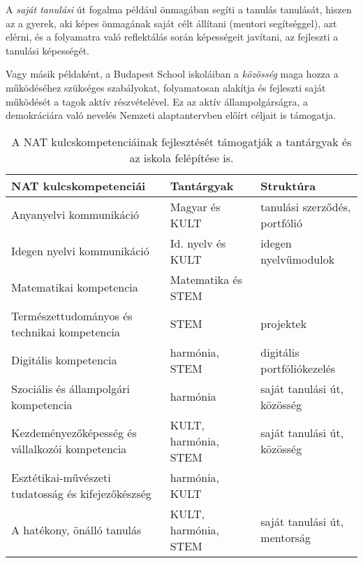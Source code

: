 A \emph{saját tanulási} út fogalma például önmagában segíti a tanulás
tanulását, hiszen az a gyerek, aki képes önmagának saját célt állítani (mentori
segítséggel), azt elérni, és a folyamatra való reflektálás során képességeit
javítani, az fejleszti a tanulási képességét.

Vagy másik példaként, a Budapest School iskoláiban a \emph{közösség} maga hozza
a működéséhez szükséges szabályokat, folyamatosan alakítja és fejleszti saját
működését a tagok aktív részvételével. Ez az aktív állampolgárságra, a
demokráciára való nevelés Nemzeti alaptantervben előírt céljait is támogatja.

\begin{table}
  \centering
  \begin{tabular}{p{5cm}|>{\raggedright}p{3cm}|p{3cm}}

    \textbf{NAT kulcskompetenciái}                     & \textbf{Tantárgyak}  &
    \textbf{Struktúra}                                                                                        \\ \hline
    Anyanyelvi kommunikáció                            &  Magyar és KULT                & tanulási szerződés, portfólió \\ \hline
    Idegen nyelvi kommunikáció                         & Id. nyelv és KULT                 & idegen nyelvű\hfill\break modulok          \\ \hline
    Matematikai kompetencia                            & Matematika és STEM                 &                               \\ \hline
    Természettudományos és technikai kompetencia       & STEM                 & projektek                     \\ \hline
    Digitális kompetencia                              & harmónia, STEM       & digitális portfóliókezelés   \\ \hline
    Szociális és állampolgári kompetencia              & harmónia             & saját tanulási út,
    közösség                                                                                                  \\ \hline
    Kezdeményezőképesség és vállalkozói kompetencia    & KULT, harmónia, STEM & saját
    tanulási út, közösség                                                                                     \\ \hline
    Esztétikai-művészeti tudatosság és kifejezőkészség & harmónia, KULT       &                               \\ \hline
    A hatékony, önálló tanulás                         & KULT, harmónia, STEM & saját tanulási út,
    mentorság                                                                                                 \\

  \end{tabular}
  \caption{A NAT kulcskompetenciáinak fejlesztését támogatják a tantárgyak és
    az iskola felépítése is.}
  \label{tbl:nat_kulcs}
\end{table}